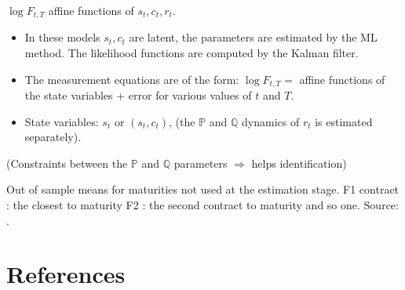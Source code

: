 \documentclass[
  12pt,
]{book}
\providecommand{\tightlist}{%
  \setlength{\itemsep}{0pt}\setlength{\parskip}{0pt}}
\theoremstyle{definition}
\theoremstyle{definition}
\theoremstyle{definition}
\theoremstyle{definition}
\theoremstyle{remark}
\begin{document}
\(\log F_{t,T}\) affine functions of \(s_t, c_t, r_t\).

\begin{itemize}
\tightlist
\item
  In these models \(s_t, c_t\) are latent, the parameters are estimated by the ML method. The likelihood functions are computed by the Kalman filter.
\item
  The measurement equations are of the form:
  \(\log F_{t,T} =\) affine functions of the state variables + error for various values of \(t\) and \(T\).
\item
  State variables: \(s_t\) or \((s_t, c_t)\), (the \(\mathbb{P}\) and \(\mathbb{Q}\) dynamics of \(r_t\) is estimated separately).
\end{itemize}

(Constraints between the \(\mathbb{P}\) and \(\mathbb{Q}\) parameters \(\Rightarrow\) helps identification)

Out of sample means for maturities not used at the estimation stage. F1 contract : the closest to maturity F2 : the second contract to maturity and so one. Source: \citet{Schwartz_1997}.

\hypertarget{references}{%
\chapter{References}\label{references}}

  
\end{document}
